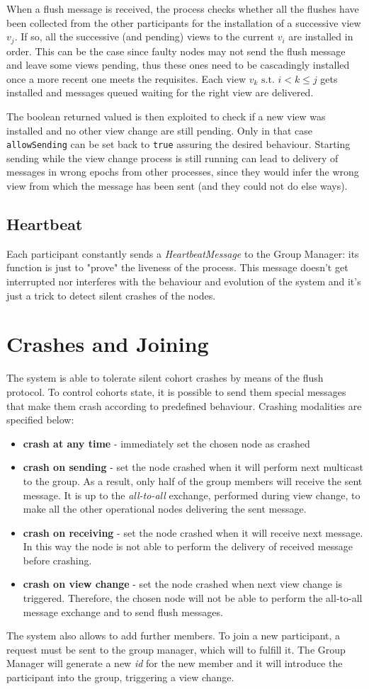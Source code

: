 \documentclass[11pt]{article}
\begin{document}
	When a flush message is received, the process checks whether all the flushes have been collected from the other participants for the installation of a successive view $v_{j}$. If so, all the successive (and pending) views to the current $v_{i}$ are installed in order. This can be the case since faulty nodes may not send the flush message and leave some views pending, thus these ones need to be cascadingly installed once a more recent one meets the requisites.\newline
	Each view $v_{k} \text{ s.t. } i < k \le j$ gets installed and messages queued waiting for the right view are delivered.\newline
	
	The boolean returned valued is then exploited to check if a new view was installed and no other view change are still pending. Only in that case \texttt{allowSending} can be set back to \texttt{true} assuring the desired behaviour.
	Starting sending while the view change process is still running can lead to delivery of messages in wrong epochs from other processes, since they would infer the wrong view from which the message has been sent (and they could not do else ways).
		
	\subsection{Heartbeat}
	Each participant constantly sends a \textit{HeartbeatMessage} to the Group Manager: its function is just to "prove" the liveness of the process. This message doesn't get interrupted nor interferes with the behaviour and evolution of the system and it's just a trick to detect silent crashes of the nodes.
	
	\section{Crashes and Joining}
	The system is able to tolerate silent cohort crashes by means of the flush protocol. To control cohorts state, it is possible to send them special messages that make them crash according to predefined behaviour. Crashing modalities are specified below:
	
	\begin{itemize}
		\item \textbf{crash at any time} - immediately set the chosen node as crashed
		\item \textbf{crash on sending} - set the node crashed when it will perform next multicast to the group. As a result, only half of the group members will receive the sent message. It is up to the \textit{all-to-all} exchange, performed during view change, to make all the other operational nodes delivering the sent message.
		\item \textbf{crash on receiving} - set the node crashed when it will receive next message. In this way the node is not able to perform the delivery of received message before crashing.
		\item \textbf{crash on view change} - set the node crashed when next view change is triggered. Therefore, the chosen node will not be able to perform the all-to-all message exchange and to send flush messages.
	\end{itemize}
	
	The system also allows to add further members. To join a new participant, a request must be sent to the group manager, which will to fulfill it. The Group Manager will generate a new \textit{id} for the new member and it will introduce the participant into the group, triggering a view change.
		
\end{document}
